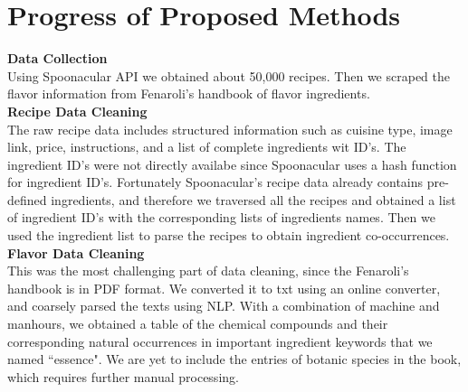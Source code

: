 \documentclass[sigconf]{acmart}
\begin{document}
\section{Progress of Proposed Methods}

\noindent
\textbf{Data Collection}\\
Using Spoonacular API we obtained about 50,000 recipes. Then we scraped the flavor information from Fenaroli’s handbook of flavor ingredients.\cite{simas2017food} \cite{burdock2016fenaroli}\\

\noindent
\textbf{Recipe Data Cleaning}\\
The raw recipe data includes structured information such as cuisine type, image link, price, instructions, and a list of complete ingredients wit ID's. The ingredient ID's were not directly availabe since Spoonacular uses a hash function for ingredient ID's. Fortunately Spoonacular's recipe data already contains pre-defined ingredients, and therefore we traversed all the recipes and obtained a list of ingredient ID's with the corresponding lists of ingredients names. Then we used the ingredient list to parse the recipes to obtain ingredient co-occurrences.\\

\noindent
\textbf{Flavor Data Cleaning}\\
This was the most challenging part of data cleaning, since the Fenaroli’s handbook  is in PDF format. We converted it to txt using an online converter, and coarsely parsed the texts using NLP. With a combination of machine and manhours, we obtained a table of the chemical compounds and their corresponding natural occurrences in important ingredient keywords that we named ``essence". We are yet to include the entries of botanic species in the book, which requires further manual processing.\\
\end{document}
